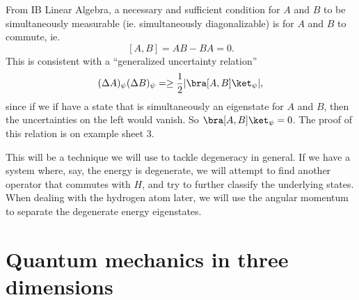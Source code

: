 \documentclass[a4paper]{article}
\begin{document}
From IB Linear Algebra, a necessary and sufficient condition for $A$ and $B$ to be simultaneously measurable (ie. simultaneously diagonalizable) is for $A$ and $B$ to commute, ie.
\[
  [A, B] = AB - BA = 0.
\]
This is consistent with a ``generalized uncertainty relation''
\[
  (\Delta A)_\psi (\Delta B)_\psi =\geq \frac{1}{2} |\bra [A, B]\ket_\psi|,
\]
since if we if have a state that is simultaneously an eigenstate for $A$ and $B$, then the uncertainties on the left would vanish. So $\bra [A, B]\ket_\psi = 0$. The proof of this relation is on example sheet 3.

This will be a technique we will use to tackle degeneracy in general. If we have a system where, say, the energy is degenerate, we will attempt to find another operator that commutes with $H$, and try to further classify the underlying states. When dealing with the hydrogen atom later, we will use the angular momentum to separate the degenerate energy eigenstates.

\section{Quantum mechanics in three dimensions}
\end{document}
